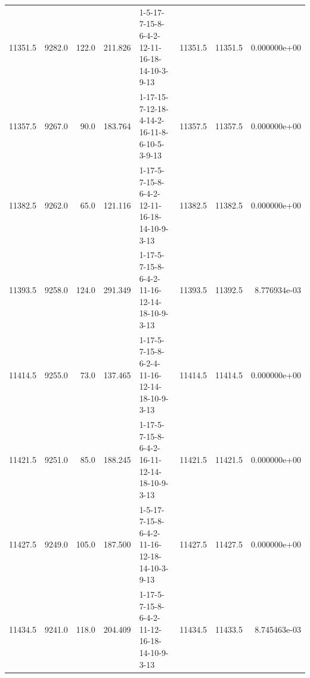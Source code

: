 \begin{tabular}{rrrrlrrr}
 11351.5 &   9282.0 &          122.0 &            211.826 &  1-5-17-7-15-8-6-4-2-12-11-16-18-14-10-3-9-13 &       11351.5 &         11351.5 &  0.000000e+00 \\
 11357.5 &   9267.0 &           90.0 &            183.764 &  1-17-15-7-12-18-4-14-2-16-11-8-6-10-5-3-9-13 &       11357.5 &         11357.5 &  0.000000e+00 \\
 11382.5 &   9262.0 &           65.0 &            121.116 &  1-17-5-7-15-8-6-4-2-12-11-16-18-14-10-9-3-13 &       11382.5 &         11382.5 &  0.000000e+00 \\
 11393.5 &   9258.0 &          124.0 &            291.349 &  1-17-5-7-15-8-6-4-2-11-16-12-14-18-10-9-3-13 &       11393.5 &         11392.5 &  8.776934e-03 \\
 11414.5 &   9255.0 &           73.0 &            137.465 &  1-17-5-7-15-8-6-2-4-11-16-12-14-18-10-9-3-13 &       11414.5 &         11414.5 &  0.000000e+00 \\
 11421.5 &   9251.0 &           85.0 &            188.245 &  1-17-5-7-15-8-6-4-2-16-11-12-14-18-10-9-3-13 &       11421.5 &         11421.5 &  0.000000e+00 \\
 11427.5 &   9249.0 &          105.0 &            187.500 &  1-5-17-7-15-8-6-4-2-11-16-12-18-14-10-3-9-13 &       11427.5 &         11427.5 &  0.000000e+00 \\
 11434.5 &   9241.0 &          118.0 &            204.409 &  1-17-5-7-15-8-6-4-2-11-12-16-18-14-10-9-3-13 &       11434.5 &         11433.5 &  8.745463e-03 \\
\bottomrule
\end{tabular}
